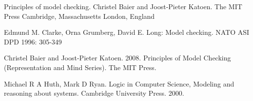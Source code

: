 \documentclass[titlepage, 12pt]{book}
\begin{document}
\begin{thebibliography}{99}
 Principles of model checking. Christel Baier and Joost-Pieter Katoen. The MIT Press Cambridge, Massachusetts
London, England

 Edmund M. Clarke, Orna Grumberg, David E. Long: Model checking. NATO ASI DPD 1996: 305-349

 Christel Baier and Joost-Pieter Katoen. 2008. Principles of Model Checking (Representation and Mind Series). The MIT Press.

 Michael R A Huth, Mark D Ryan. Logic in Computer Science, Modeling and reasoning about systems. Cambridge University Press. 2000.

\end{thebibliography}
\end{document}
